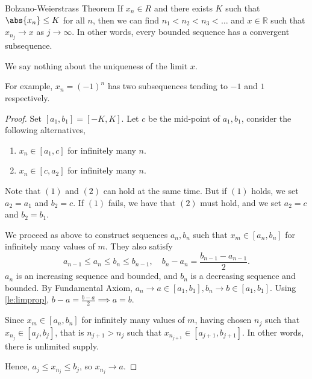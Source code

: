 \leavevmode
\begin{theorem}{Bolzano-Weierstrass Theorem}
If \(x_n \in R\) and there exists \(K\) such that \(\abs{x_n} \leq  K\) for all \(n\), then we can find \(n_1<n_2<n_3<\dots\) and \(x\in \mathbb{R}\) such that \(x_{n_j} \to x\) as \(j \to\infty\).
In other words, every bounded sequence has a convergent subsequence.
\end{theorem}
\begin{remark}
    We say nothing about the uniqueness of the limit \(x\).

    For example, \(x_n = (-1)^n\) has two subsequences tending to \(-1\) and \(1\) respectively.
\end{remark}
\begin{proof}
    Set \([a_1,b_1] = [-K,K]\). Let \(c\) be the mid-point of \(a_1, b_1\), consider the following alternatives,
    \begin{enumerate}
        \item \(x_n \in [a_1,c]\) for infinitely many \(n\).
        \item \(x_n \in [c,a_2]\) for infinitely many \(n\).
    \end{enumerate}
    Note that \((1)\) and \((2)\) can hold at the same time. But if \((1)\) holds, we set \(a_2 = a_1\) and \(b_2 = c\). If \((1)\) fails, we have that \((2)\) must hold, and we set \(a_2 = c\) and \(b_2 = b_1\).

    We proceed as above to construct sequences \(a_n, b_n\) such that \(x_m \in [a_n, b_n]\) for infinitely many values of \(m\). They also satisfy
    \[
        a_{n-1}\leq a_n\leq b_n\leq b_{n-1},\quad b_n - a_n = \frac{b_{n-1}-a_{n-1}}{2}.
    \]
    \(a_n\) is an increasing sequence and bounded, and \(b_n\) is a decreasing sequence and bounded. By Fundamental Axiom,
    \(a_n \to a \in [a_1,b_1], b_n \to b \in [a_1,b_1]\). Using \cref{le:limprop}, \(b - a = \frac{b - a}{2}\implies a=b\).

    Since \(x_m \in [a_n, b_n]\) for infinitely many values of \(m\), having chosen \(n_j\) such that \(x_{n_j}\in [a_j,b_j]\), that is \(n_{j+1}>n_j\) such that \(x_{n_{j+1}} \in [a_{j+1},b_{j+1}]\). In other words, there is unlimited supply.

    Hence, \(a_j\leq x_{n_{j}}\leq b_j\), so \(x_{n_j}\to a\).
\end{proof}
